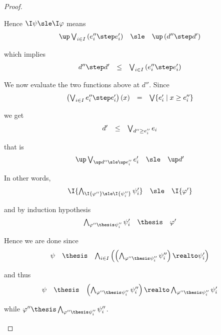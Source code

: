 \begin{proof}
\begin{description}
Hence $\I\psi \sle \I\varphi$ means
\[
\begin{array}{l l l}
  \up \bigvee_{i \in I} \left(e''_i \step e'_i \right)
& \sle
& \up \left( d'' \step d' \right)
\end{array}
\]

\noindent
which implies
\[
\begin{array}{l l l}
  d'' \step d'
& \leq
& \bigvee_{i \in I} \left(e''_i \step e'_i \right)
\end{array}
\]

\noindent
We now evaluate the two functions above at $d''$.
Since
\[
\begin{array}{l l l}
  \left( \bigvee_{i \in I} e''_i \step e'_i \right)(x)
& =
& \bigvee \{ e'_i \mid x \geq e''_i\}
\end{array}
\]

\noindent
we get
\[
\begin{array}{l l l}
  d'
& \leq
& \bigvee_{d'' \geq e''_i} e_i
\end{array}
\]

\noindent
that is
\[
\begin{array}{l l l}
  \up \bigvee_{\up d'' \sle \up e''_i} e'_i
& \sle
& \up d'
\end{array}
\]

\noindent
In other words,
\[
\begin{array}{l l l}
  \I{\bigwedge_{\I{\varphi''} \sle \I{\psi ''_i}} \psi'_i}
& \sle
& \I{\varphi'}
\end{array}
\]

\noindent
and by induction hypothesis
\[
\begin{array}{l l l}
  \bigwedge_{\varphi'' \thesis \psi ''_i} \psi'_i
& \thesis
& \varphi'
\end{array}
\]

Hence we are done since
\[
\begin{array}{l l l}
  \psi
& \thesis
& \bigwedge_{i \in I} \left(
  \left( \bigwedge_{\varphi'' \thesis \psi ''_i} \psi''_i \right)
  \realto
  \psi'_i
  \right)
\end{array}
\]

\noindent
and thus
\[
\begin{array}{l l l}
  \psi
& \thesis
& \left( \bigwedge_{\varphi'' \thesis \psi ''_i} \psi''_i \right)
  \realto
  \bigwedge_{\varphi'' \thesis \psi ''_i} \psi'_i
\end{array}
\]

\noindent
while
\(
\varphi'' \thesis \bigwedge_{\varphi'' \thesis \psi ''_i} \psi''_i
\).
\qedhere
\end{description}
\end{proof}


